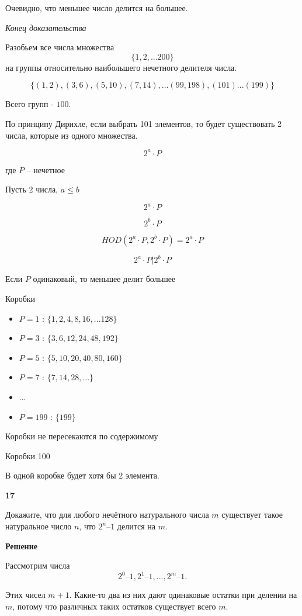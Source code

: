 \documentclass{article}
\begin{document}
Очевидно, что меньшее число делится на большее.

\textit{Конец доказательства}

Разобьем все числа множества $$\{1, 2, ... 200\}$$  на группы относительно наибольшего нечетного делителя числа. 

$$\{ (1, 2), (3, 6), (5, 10), (7, 14), ...(99, 198),  (101) ... (199) \}$$

Всего групп -  $100$.

По принципу Дирихле, если выбрать 101 элементов, то будет существовать 2 числа, которые из одного множества. 
 
$$2^a \cdot P$$

где $P$ -- нечетное 

Пусть 2 числа, $a \le b$

$$2^a \cdot P$$

$$2^b \cdot P$$

$$HOD(2^a \cdot P, 2^b \cdot P) = 2^a \cdot P$$

$$2^a \cdot P  | 2^b \cdot P$$

Если $P$ одинаковый, то меньшее делит большее


Коробки 

\begin{itemize}
    \item $P = 1$ : $\{ 1, 2, 4, 8, 16, ... 128 \}$
    \item $P = 3$ : $\{ 3, 6, 12, 24, 48, 192 \}$
    \item $P = 5$  : $\{ 5, 10, 20, 40, 80, 160 \}$
    \item $P = 7$  : $\{ 7, 14, 28, ... \}$
    \item ...
    \item $P = 199$  : $\{199 \}$
\end{itemize}

Коробки не пересекаются по содержимому

Коробки 100

В одной коробке будет хотя бы 2 элемента. 
 
 
\newpage

\textbf{17}

Докажите, что для любого нечётного натурального числа  $m$ существует такое натуральное число $n$, что  $2^n – 1$  делится на $m$.

\textbf{Решение}

Рассмотрим числа  $$2^0 – 1,  2^1 – 1,  ...,  2^m – 1.$$

Этих чисел  $m + 1$.  Какие-то два из них дают одинаковые остатки при делении на $m$, потому что различных таких остатков существует всего $m$. 
\end{document}
